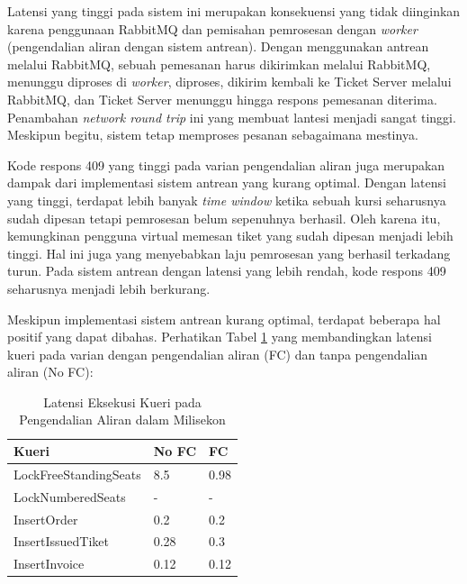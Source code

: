 Latensi yang tinggi pada sistem ini merupakan konsekuensi yang tidak diinginkan karena penggunaan RabbitMQ dan pemisahan pemrosesan dengan \textit{worker} (pengendalian aliran dengan sistem antrean). Dengan menggunakan antrean melalui RabbitMQ, sebuah pemesanan harus dikirimkan melalui RabbitMQ, menunggu diproses di \textit{worker}, diproses, dikirim kembali ke Ticket Server melalui RabbitMQ, dan Ticket Server menunggu hingga respons pemesanan diterima. Penambahan \textit{network round trip} ini yang membuat lantesi menjadi sangat tinggi. Meskipun begitu, sistem tetap memproses pesanan sebagaimana mestinya.

Kode respons 409 yang tinggi pada varian pengendalian aliran juga merupakan dampak dari implementasi sistem antrean yang kurang optimal. Dengan latensi yang tinggi, terdapat lebih banyak \textit{time window} ketika sebuah kursi seharusnya sudah dipesan tetapi pemrosesan belum sepenuhnya berhasil. Oleh karena itu, kemungkinan pengguna virtual memesan tiket yang sudah dipesan menjadi lebih tinggi. Hal ini juga yang menyebabkan laju pemrosesan yang berhasil terkadang turun. Pada sistem antrean dengan latensi yang lebih rendah, kode respons 409 seharusnya menjadi lebih berkurang.

Meskipun implementasi sistem antrean kurang optimal, terdapat beberapa hal positif yang dapat dibahas. Perhatikan Tabel \ref{table:latensi-kueri-fc-nofc} yang membandingkan latensi kueri pada varian dengan pengendalian aliran (FC) dan tanpa pengendalian aliran (No FC):

\begin{table}[h]
    \centering
    \caption{Latensi Eksekusi Kueri pada Pengendalian Aliran dalam Milisekon}
    \label{table:latensi-kueri-fc-nofc}
    \begin{tabular}{|l|l|l|}
        \hline
        \textbf{Kueri}        & \textbf{No FC} & \textbf{FC} \\
        \hline
        LockFreeStandingSeats & 8.5            & 0.98        \\
        \hline
        LockNumberedSeats     & -              & -           \\
        \hline
        InsertOrder           & 0.2            & 0.2         \\
        \hline
        InsertIssuedTiket     & 0.28           & 0.3         \\
        \hline
        InsertInvoice         & 0.12           & 0.12        \\
        \hline
    \end{tabular}
\end{table}

